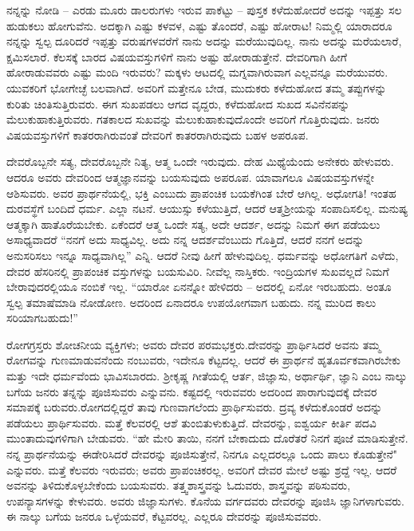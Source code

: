 ನನ್ನನ್ನು ನೋಡಿ – ಎರಡು ಮೂರು ಡಾಲರುಗಳು ಇರುವ ಪಾಕೆಟ್ಟು – ಪುಸ್ತಕ ಕಳೆದುಹೋದರೆ ಅದನ್ನು ಇಪ್ಪತ್ತು ಸಲ ಹುಡುಕಲು ಹೋಗುವೆನು. ಅದಕ್ಕಾಗಿ ಎಷ್ಟು ಕಳವಳ, ಎಷ್ಟು ತೊಂದರೆ, ಎಷ್ಟು ಹೋರಾಟ! ನಿಮ್ಮಲ್ಲಿ ಯಾರಾದರೂ ನನ್ನನ್ನು ಸ್ವಲ್ಪ ದೂರಿದರೆ ಇಪ್ಪತ್ತು ವರುಷಗಳವರೆಗೆ ನಾನು ಅದನ್ನು ಮರೆಯುವುದಿಲ್ಲ. ನಾನು ಅದನ್ನು ಮರೆಯಲಾರೆ, ಕ್ಷಮಿಸಲಾರೆ. ಕೆಲಸಕ್ಕೆ ಬಾರದ ವಿಷಯವಸ್ತುಗಳಿಗೆ ನಾನು ಅಷ್ಟು ಹೋರಾಡುತ್ತೇನೆ. ದೇವರಿಗಾಗಿ ಹೀಗೆ ಹೋರಾಡುವವರು ಎಷ್ಟು ಮಂದಿ ಇರುವರು? ಮಕ್ಕಳು ಆಟದಲ್ಲಿ ಮಗ್ನವಾಗಿರುವಾಗ ಎಲ್ಲವನ್ನೂ ಮರೆಯುವರು. ಯುವಕರಿಗೆ ಭೋಗೇಚ್ಛೆ ಬಲವಾಗಿದೆ. ಅವರಿಗೆ ಮತ್ತೇನೂ ಬೇಡ, ಮುದುಕರು ಕಳೆದುಹೋದ ತಮ್ಮ ತಪ್ಪುಗಳನ್ನು ಕುರಿತು ಚಿಂತಿಸುತ್ತಿರುವರು. ಈಗ ಸುಖಪಡಲು ಆಗದ ವೃದ್ದರು, ಕಳೆದುಹೋದ ಸುಖದ ಸವಿನೆನಪನ್ನು ಮೆಲುಕುಹಾಕುತ್ತಿರುವರು. ಗತಕಾಲದ ಸುಖವನ್ನು ಮೆಲುಕುಹಾಕುವುದೊಂದೇ ಅವರಿಗೆ ಗೊತ್ತಿರುವುದು. ಜನರು ವಿಷಯವಸ್ತುಗಳಿಗೆ ಕಾತರರಾಗಿರುವಂತೆ ದೇವರಿಗೆ ಕಾತರರಾಗಿರುವುದು ಬಹಳ ಅಪರೂಪ.

ದೇವರೊಬ್ಬನೇ ಸತ್ಯ, ದೇವರೊಬ್ಬನೇ ನಿತ್ಯ, ಆತ್ಮ ಒಂದೇ ಇರುವುದು. ದೇಹ ಮಿಥ್ಯೆಯೆಂದು ಅನೇಕರು ಹೇಳುವರು. ಆದರೂ ಅವರು ದೇವರಿಂದ ಆತ್ಮಜ್ಞಾನವನ್ನು ಬಯಸುವುದು ಅಪರೂಪ. ಯಾವಾಗಲೂ ವಿಷಯವಸ್ತುಗಳನ್ನೇ ಆಶಿಸುವರು. ಅವರ ಪ್ರಾರ್ಥನೆಯಲ್ಲಿ, ಭಕ್ತಿ ಎಂಬುದು ಪ್ರಾಪಂಚಿಕ ಬಯಕೆಗಿಂತ ಬೇರೆ ಆಗಿಲ್ಲ. ಅಧೋಗತಿ! ಇಂತಹ ದುರವಸ್ಥೆಗೆ ಬಂದಿದೆ ಧರ್ಮ. ಎಲ್ಲಾ ನಟನೆ. ಆಯುಸ್ಸು ಕಳೆಯುತ್ತಿದೆ, ಆದರೆ ಆತ್ಮಶ‍್ರೀಯನ್ನು ಸಂಪಾದಿಸಲಿಲ್ಲ. ಮನುಷ್ಯ ಆತ್ಮಕ್ಕಾಗಿ ಹಾತೊರೆಯಬೇಕು. ಏಕೆಂದರೆ ಆತ್ಮ ಒಂದೇ ಸತ್ಯ, ಅದೇ ಆದರ್ಶ, ಅದನ್ನು ನಿಮಗೆ ಈಗ ಪಡೆಯಲು ಅಸಾಧ್ಯವಾದರೆ “ನನಗೆ ಅದು ಸಾಧ್ಯವಿಲ್ಲ. ಅದು ನನ್ನ ಆದರ್ಶವೆಂಬುದು ಗೊತ್ತಿದೆ, ಆದರೆ ನನಗೆ ಅದನ್ನು ಅನುಸರಿಸಲು ಇನ್ನೂ ಸಾಧ್ಯವಾಗಿಲ್ಲ” ಎನ್ನಿ. ಆದರೆ ನೀವು ಹೀಗೆ ಹೇಳುವುದಿಲ್ಲ. ಧರ್ಮವನ್ನು ಅಧೋಗತಿಗೆ ಎಳೆದು, ದೇವರ ಹೆಸರಿನಲ್ಲಿ ಪ್ರಾಪಂಚಿಕ ವಸ್ತುಗಳನ್ನು ಬಯಸುವಿರಿ. ನೀವೆಲ್ಲ ನಾಸ್ತಿಕರು. ಇಂದ್ರಿಯಗಳ ಸುಖವಲ್ಲದೆ ನಿಮಗೆ ಬೇರಾವುದರಲ್ಲಿಯೂ ನಂಬಿಕೆ ಇಲ್ಲ. “ಯಾರೋ ಏನನ್ನೋ ಹೇಳಿದರು – ಅದರಲ್ಲಿ ಏನೋ ಇರಬಹುದು. ಅಂತೂ ಸ್ವಲ್ಪ ತಮಾಷೆಮಾಡಿ ನೋಡೋಣ. ಅದರಿಂದ ಏನಾದರೂ ಉಪಯೋಗವಾಗ ಬಹುದು. ನನ್ನ ಮುರಿದ ಕಾಲು ಸರಿಯಾಗಬಹುದು!”

ರೋಗಗ್ರಸ್ತರು ಶೋಚನೀಯ ವ್ಯಕ್ತಿಗಳು; ಅವರು ದೇವರ ಪರಮಭಕ್ತರು.\break ದೇವರನ್ನು ಪ್ರಾರ್ಥಿಸಿದರೆ ಅವನು ತಮ್ಮ ರೋಗವನ್ನು ಗುಣಮಾಡುವನೆಂದು ನಂಬುವರು, ಇದೇನೂ ಕೆಟ್ಟದಲ್ಲ. ಆದರೆ ಈ ಪ್ರಾರ್ಥನೆ ಹೃತೂರ್ವಕವಾಗಿರಬೇಕು ಮತ್ತು ಇದೇ ಧರ್ಮವೆಂದು ಭಾವಿಸಬಾರದು. ಶ‍್ರೀಕೃಷ್ಣ ಗೀತೆಯಲ್ಲಿ ಆರ್ತ, ಜಿಜ್ಞಾಸು, ಅರ್ಥಾರ್ಥಿ, ಜ್ಞಾನಿ ಎಂಬ ನಾಲ್ಕು ಬಗೆಯ ಜನರು ತನ್ನನ್ನು ಪೂಜಿಸುವರು ಎನ್ನುವನು. ಕಷ್ಟದಲ್ಲಿ ಇರುವವರು ಅದರಿಂದ ಪಾರಾಗುವುದಕ್ಕೆ ದೇವರ ಸಮಾಪಕ್ಕೆ ಬರುವರು.\break ರೋಗದಲ್ಲಿದ್ದರೆ ತಾವು ಗುಣವಾಗಲೆಂದು ಪ್ರಾರ್ಥಿಸುವರು. ದ್ರವ್ಯ ಕಳೆದುಕೊಂಡರೆ ಅದನ್ನು ಪಡೆಯಲು ಪ್ರಾರ್ಥಿಸುವರು. ಮತ್ತೆ ಕೆಲವರಲ್ಲಿ ಆಶೆ ತುಂಬಿತುಳುಕುತ್ತಿದೆ. ದೇವರನ್ನು, ಐಶ್ವರ್ಯ ಕೀರ್ತಿ ಪದವಿ ಮುಂತಾದುವುಗಳಿಗಾಗಿ ಬೇಡುವರು. “ಹೇ ಮೇರಿ ತಾಯಿ, ನನಗೆ ಬೇಕಾದುದು ದೊರೆತರೆ ನಿನಗೆ ಪೂಜೆ ಮಾಡಿಸುತ್ತೇನೆ. ನನ್ನ ಪ್ರಾರ್ಥನೆಯನ್ನು ಈಡೇರಿಸಿದರೆ ದೇವರನ್ನು ಪೂಜಿಸುತ್ತೇನೆ, ನಿನಗೂ ಎಲ್ಲದರಲ್ಲೂ ಒಂದು ಪಾಲು ಕೊಡುತ್ತೇನೆ" ಎನ್ನುವರು. ಮತ್ತೆ ಕೆಲವರು ಇರುವರು; ಅವರು ಪ್ರಾಪಂಚಿಕರಲ್ಲ. ಅವರಿಗೆ ದೇವರ ಮೇಲೆ ಅಷ್ಟು ಶ್ರದ್ದೆ ಇಲ್ಲ. ಆದರೆ ಅವನನ್ನು ತಿಳಿದುಕೊಳ್ಳಬೇಕೆಂದು ಬಯಸುವರು. ತತ್ತ್ವಶಾಸ್ತ್ರವನ್ನು ಓದುವರು, ಶಾಸ್ತ್ರವನ್ನು ಪಠಿಸುವರು, ಉಪನ್ಯಾಸಗಳನ್ನು ಕೇಳುವರು. ಅವರು ಜಿಜ್ಞಾಸುಗಳು. ಕೊನೆಯ ವರ್ಗದವರು ದೇವರನ್ನು ಪೂಜಿಸಿ ಜ್ಞಾನಿಗಳಾಗುವರು. ಈ ನಾಲ್ಕು ಬಗೆಯ ಜನರೂ ಒಳ್ಳೆಯವರೆ, ಕೆಟ್ಟವರಲ್ಲ. ಎಲ್ಲರೂ ದೇವರನ್ನು ಪೂಜಿಸುವವರು.

